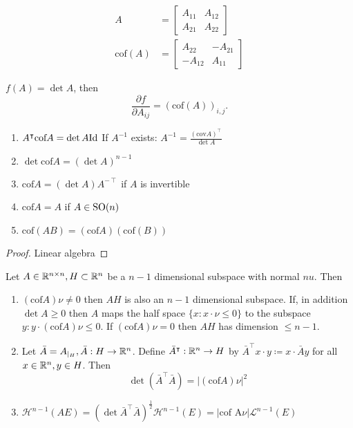 \begin{align*}
    A&=\begin{bmatrix}
        A_{11} & A_{12}\\
        A_{21} & A_{22}
    \end{bmatrix}\\
    \text{cof}(A) &= \begin{bmatrix}
        A_{22} & -A_{21}\\
        -A_{12} & A_{11}
    \end{bmatrix}
\end{align*}

 \(f(A)=\det A\), then \[\frac{\partial f}{\partial A_{ij}}=(\text{cof}(A))_{i,j}.\]

\begin{lemma}\label{lem:1.9}
    \begin{enumerate}
        \item \(A^\intercal \text{cof} A = \det{A}\text{Id}\) If \(A^{-1}\) exists: \(A^{-1}=\frac{(\text{cov} A)^\intercal}{\det A}\)
        \item \(\det \text{cof} A=(\det A)^{n-1}\)
        \item \(\text{cof} A = (\det A)A^{-\intercal}\) if \(A\) is invertible
        \item \(\text{cof} A = A\) if \(A\in {\text{SO}}(n)\)
        \item \(\text{cof}(AB)=(\text{cof}A)(\text{cof}(B))\)
    \end{enumerate}
\end{lemma}

\begin{proof}
    Linear algebra
\end{proof}

\begin{lemma}\label{lem:1.10}
    Let \(A\in \mathbb{R}^{n\times n}, H\subset \mathbb{R}^n\) be a \(n-1\) dimensional subspace with normal \(nu\).
    Then 
    \begin{enumerate}
        \item \((\text{cof} A)\nu\neq 0\) then \(AH\) is also an \(n-1\) dimensional subspace. 
            If, in addition \(\det A\geq 0\) then \(A\) maps the half space \(\{x:x\cdot\nu\leq 0\}\) to the subspace 
            \(y:y\cdot (\text{cof}A)\nu\leq 0\). If \((\text{cof}A)\nu=0\) then \(AH\) has dimension \(\leq n-1\).
        \item Let \(\bar{A}=A_{|_{H}},\bar{A}:H\to\mathbb{R}^n\). Define \(\bar{A}^\intercal: \mathbb{R}^n\to H\) by 
            \(\bar{A}^\intercal x \cdot y \coloneqq x \cdot \bar{A} y\) for all \(x\in \mathbb{R}^n,y\in H\). Then 
            \[\det\left(\bar{A}^\intercal\bar{A}\right)=\vert (\text{cof}A)\nu\vert^2\]
        \item \(\mathcal{H}^{n-1}(AE)=(\det \bar{A}^\intercal \bar{A})^{\frac{1}{2}}\mathcal{H}^{n-1}(E)=|\text{cof A} \nu|\mathcal{L}^{n-1}(E)\)    
    \end{enumerate}
\end{lemma}

